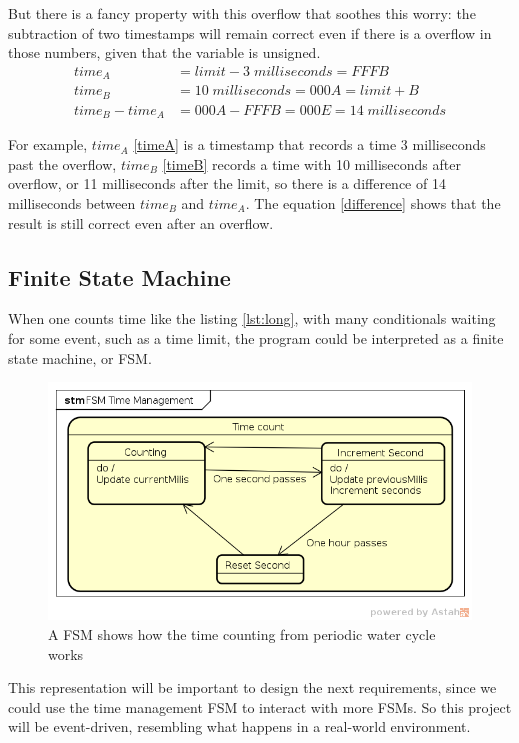 But there is a fancy property with this overflow that soothes this worry:
the subtraction of two timestamps will remain correct even if there is a overflow in those numbers,
given that the variable is unsigned.
\begin{align}
    time_A &=limit - 3\;milliseconds =FFFB  \label{timeA} \\ 
    time_B &= 10\;milliseconds =000A =limit + B  \label{timeB} \\ 
    time_B - time_A &= 000A - FFFB =000E =14\;milliseconds \label{difference}
\end{align}

For example,
$time_A$ \eqref{timeA} is a timestamp that records a time 3 milliseconds past the overflow,
$time_B$ \eqref{timeB} records a time with 10 milliseconds after overflow,
or 11 milliseconds after the limit,
so there is a difference of 14 milliseconds between $time_B$ and $time_A$.
The equation \eqref{difference} shows that the result is still correct even after an overflow.

\subsection{Finite State Machine}
When one counts time like the listing \ref{lst:long},
with many conditionals waiting for some event,
such as a time limit,
the program could be interpreted as a finite state machine, or FSM.

\begin{figure}[h]
    \centering
    \includegraphics[width=.7\textwidth]{diagrams/FSM_TM.png}
    \caption{A FSM shows how the time counting from periodic water cycle works}
    \label{fig:fsm_tm}
\end{figure}

This representation will be important to design the next requirements,
since we could use the time management FSM to interact with more FSMs.
So this project will be event-driven,
resembling what happens in a real-world environment.

